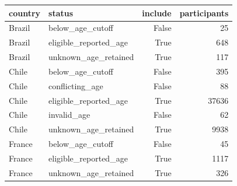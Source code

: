 \begin{tabular}{llrr}
\toprule
country & status & include & participants \\
\midrule
Brazil & below_age_cutoff & False & 25 \\
Brazil & eligible_reported_age & True & 648 \\
Brazil & unknown_age_retained & True & 117 \\
Chile & below_age_cutoff & False & 395 \\
Chile & conflicting_age & False & 88 \\
Chile & eligible_reported_age & True & 37636 \\
Chile & invalid_age & False & 62 \\
Chile & unknown_age_retained & True & 9938 \\
France & below_age_cutoff & False & 45 \\
France & eligible_reported_age & True & 1117 \\
France & unknown_age_retained & True & 326 \\
\bottomrule
\end{tabular}
